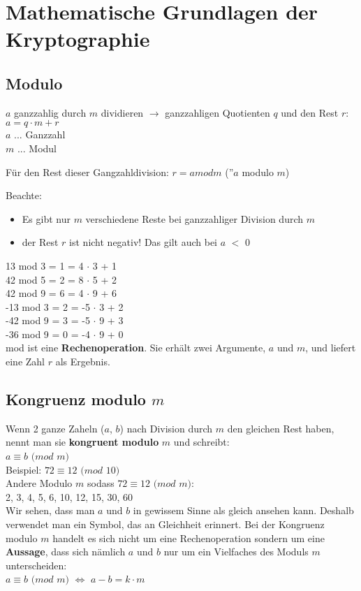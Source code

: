 \chapter{Mathematische Grundlagen der Kryptographie}
\section{Modulo}
$a$ ganzzahlig durch $m$ dividieren $\rightarrow$ ganzzahligen Quotienten $q$ und den Rest $r$: \\
$a = q \cdot m + r$ \\
$a$ ... Ganzzahl \\
$m$ ... Modul

Für den Rest dieser Gangzahldivision:
$r = a mod m$ (''$a$ modulo $m$)

Beachte:
\begin{itemize}
	\item Es gibt nur $m$ verschiedene Reste bei ganzzahliger Division durch $m$
	\item der Rest $r$ ist nicht negativ! Das gilt auch bei $a$ $<$ 0
\end{itemize}

13 mod 3 = 1  = 4 $\cdot$ 3 + 1\\
42 mod 5 = 2  = 8 $\cdot$ 5 + 2\\
42 mod 9 = 6  = 4 $\cdot$ 9 + 6\\
-13 mod 3 = 2  = -5 $\cdot$ 3 + 2\\
-42 mod 9 = 3  = -5 $\cdot$ 9 + 3\\
-36 mod 9 = 0  = -4 $\cdot$ 9 + 0 \\

mod ist eine \textbf{Rechenoperation}. Sie erhält zwei Argumente, $a$ und $m$, und liefert eine Zahl $r$ als Ergebnis.

\section{Kongruenz modulo $m$}
Wenn 2 ganze Zaheln ($a$, $b$) nach Division durch $m$ den gleichen Rest haben, nennt man sie \textbf{kongruent modulo} $m$ und schreibt:\\
$a \equiv b$ $(mod$ $m)$ \\
Beispiel: $72 \equiv 12$ $(mod$ $10)$ \\
Andere Modulo $m$ sodass $72 \equiv 12$ $(mod$ $m)$: \\
2, 3, 4, 5, 6, 10, 12, 15, 30, 60 \\
Wir sehen, dass man $a$ und $b$ in gewissem Sinne als gleich ansehen kann. Deshalb verwendet man ein Symbol, das an Gleichheit erinnert. Bei der Kongruenz modulo $m$ handelt es sich nicht um eine Rechenoperation sondern um eine \textbf{Aussage}, dass sich nämlich $a$ und $b$ nur um ein Vielfaches des Moduls $m$ unterscheiden: \\
$a \equiv b$ $(mod$ $m)$ $\Leftrightarrow$ $a - b = k \cdot m$


